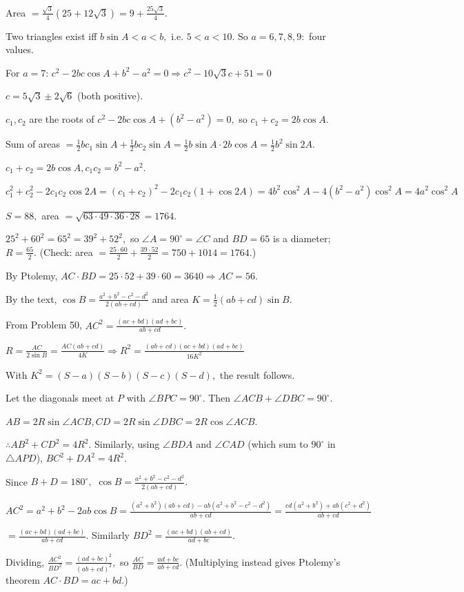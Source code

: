   Area $= \frac{\sqrt{3}}{4}(25 + 12\sqrt{3}) = 9 + \frac{25\sqrt{3}}{4}.$
\item Two triangles exist iff $b\sin A < a < b,$ i.e. $5 < a < 10.$ So $a = 6, 7, 8, 9:$ four values.

  For $a = 7$: $c^2 - 2bc\cos A + b^2 - a^2 = 0\Rightarrow c^2 - 10\sqrt{3}c + 51 = 0$

  $c = 5\sqrt{3}\pm 2\sqrt{6}$ (both positive).
\item $c_1, c_2$ are the roots of $c^2 - 2bc\cos A + (b^2 - a^2) = 0,$ so $c_1 + c_2 = 2b\cos A.$

  Sum of areas $= \frac{1}{2}bc_1\sin A + \frac{1}{2}bc_2\sin A = \frac{1}{2}b\sin A\cdot 2b\cos A = \frac{1}{2}b^2\sin 2A.$
\item $c_1 + c_2 = 2b\cos A, c_1c_2 = b^2 - a^2.$

  $c_1^2 + c_2^2 - 2c_1c_2\cos 2A = (c_1 + c_2)^2 - 2c_1c_2(1 + \cos 2A) = 4b^2\cos^2A - 4(b^2 - a^2)\cos^2A = 4a^2\cos^2A$
\item $S = 88,$ area $= \sqrt{63\cdot 49\cdot 36\cdot 28} = 1764.$

  $25^2 + 60^2 = 65^2 = 39^2 + 52^2,$ so $\angle A = 90^\circ = \angle C$ and $BD = 65$ is a diameter; $R = \frac{65}{2}.$
  (Check: area $= \frac{25\cdot 60}{2} + \frac{39\cdot 52}{2} = 750 + 1014 = 1764.$)

  By Ptolemy, $AC\cdot BD = 25\cdot 52 + 39\cdot 60 = 3640\Rightarrow AC = 56.$
\item By the text, $\cos B = \frac{a^2 + b^2 - c^2 - d^2}{2(ab + cd)}$ and area $K = \frac{1}{2}(ab + cd)\sin B.$

  From Problem 50, $AC^2 = \frac{(ac + bd)(ad + bc)}{ab + cd}.$

  $R = \frac{AC}{2\sin B} = \frac{AC(ab + cd)}{4K}\Rightarrow R^2 = \frac{(ab + cd)(ac + bd)(ad + bc)}{16K^2}$

  With $K^2 = (S - a)(S - b)(S - c)(S - d),$ the result follows.
\item Let the diagonals meet at $P$ with $\angle BPC = 90^\circ.$ Then $\angle ACB + \angle DBC = 90^\circ.$

  $AB = 2R\sin\angle ACB, CD = 2R\sin\angle DBC = 2R\cos\angle ACB.$

  $\therefore AB^2 + CD^2 = 4R^2.$ Similarly, using $\angle BDA$ and $\angle CAD$ (which sum to $90^\circ$ in $\triangle APD$),
  $BC^2 + DA^2 = 4R^2.$
\item Since $B + D = 180^\circ,$ $\cos B = \frac{a^2 + b^2 - c^2 - d^2}{2(ab + cd)}.$

  $AC^2 = a^2 + b^2 - 2ab\cos B = \frac{(a^2 + b^2)(ab + cd) - ab(a^2 + b^2 - c^2 - d^2)}{ab + cd} = \frac{cd(a^2 + b^2) +
  ab(c^2 + d^2)}{ab + cd}$

  $= \frac{(ac + bd)(ad + bc)}{ab + cd}.$ Similarly $BD^2 = \frac{(ac + bd)(ab + cd)}{ad + bc}.$

  Dividing, $\frac{AC^2}{BD^2} = \frac{(ad + bc)^2}{(ab + cd)^2},$ so $\frac{AC}{BD} = \frac{ad + bc}{ab + cd}.$ (Multiplying
  instead gives Ptolemy's theorem $AC\cdot BD = ac + bd.$)
\stopitemize
